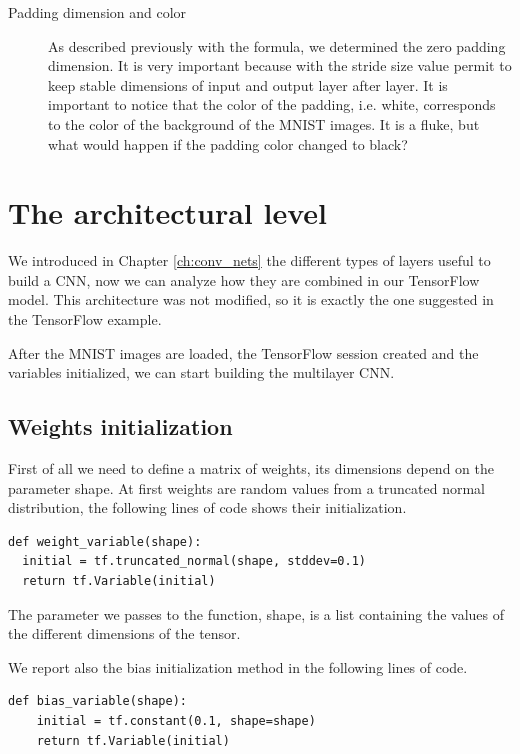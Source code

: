 \begin{description}
	\item[Padding dimension and color] As described previously with the formula, we determined the zero padding dimension. It is very important because with the stride size value permit to keep stable dimensions of input and output layer after layer. It is important to notice that the color of the padding, i.e. white, corresponds to the color of the background of the MNIST images. It is a fluke, but what would happen if the padding color changed to black?

\end{description}

\section{The architectural level}

We introduced in Chapter \ref{ch:conv_nets} the different types of layers useful to build a \acs{CNN}, now we can analyze how they are combined in our TensorFlow model. This architecture was not modified, so it is exactly the one suggested in the TensorFlow example.

After the MNIST images are loaded, the TensorFlow session created and the variables initialized, we can start building the multilayer \acs{CNN}.

\subsection{Weights initialization}

First of all we need to define a matrix of weights, its dimensions depend on the parameter shape. At first weights are random values from a truncated normal distribution, the following lines of code shows their initialization.

\begin{lstlisting}
def weight_variable(shape):
  initial = tf.truncated_normal(shape, stddev=0.1)
  return tf.Variable(initial)
\end{lstlisting}

The parameter we passes to the function, shape, is a list containing the values of the different dimensions of the tensor.

We report also the bias initialization method in the following lines of code.

\begin{lstlisting}
def bias_variable(shape):
	initial = tf.constant(0.1, shape=shape)
	return tf.Variable(initial)
\end{lstlisting}

